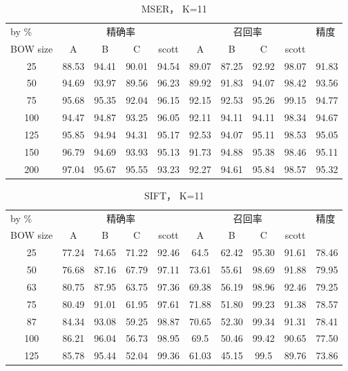 \documentclass{article}
\begin{document}
\begin{table}[]
\begin{tabular}{|c|c|c|c|c|c|c|c|c|c|}
\hline
\multicolumn{1}{|l|}{by \%} & \multicolumn{4}{c|}{精确率} & \multicolumn{4}{c|}{召回率} & \multicolumn{1}{l|}{\multirow{2}{*}{精度}} \\ \cline{1-9}
BOW size & A & B & C & scott & A & B & C & scott & \multicolumn{1}{l|}{} \\ \hline
25 & 88.53 & 94.41 & 90.01 & 94.54 & 89.07 & 87.25 & 92.92 & 98.07 & 91.83 \\ \hline
50 & 94.69 & 93.97 & 89.56 & 96.23 & 89.92 & 91.83 & 94.07 & 98.42 & 93.56 \\ \hline
75 & 95.68 & 95.35 & 92.04 & 96.15 & 92.15 & 92.53 & 95.26 & 99.15 & 94.77 \\ \hline
100 & 94.47 & 94.87 & 93.25 & 96.05 & 92.11 & 94.11 & 94.11 & 98.34 & 94.67 \\ \hline
125 & 95.85 & 94.94 & 94.31 & 95.17 & 92.53 & 94.07 & 95.11 & 98.53 & 95.05 \\ \hline
150 & 96.79 & 94.69 & 93.93 & 95.13 & 91.73 & 94.88 & 95.38 & 98.46 & 95.11 \\ \hline
200 & 97.04 & 95.67 & 95.55 & 93.23 & 92.27 & 94.61 & 95.84 & 98.57 & 95.32 \\ \hline
\end{tabular}
\caption{MSER， K=11}
\end{table}

\begin{table}[]
\begin{tabular}{|c|c|c|c|c|c|c|c|c|c|}
\hline
\multicolumn{1}{|l|}{by \%} & \multicolumn{4}{c|}{精确率} & \multicolumn{4}{c|}{召回率} & \multicolumn{1}{l|}{\multirow{2}{*}{精度}} \\ \cline{1-9}
BOW size & A & B & C & scott & A & B & C & scott & \multicolumn{1}{l|}{} \\ \hline
25 & 77.24 & 74.65 & 71.22 & 92.46 & 64.5 & 62.42 & 95.30 & 91.61 & 78.46 \\ \hline
50 & 76.68 & 87.16 & 67.79 & 97.11 & 73.61 & 55.61 & 98.69 & 91.88 & 79.95 \\ \hline
63 & 80.75 & 87.95 & 63.75 & 97.36 & 69.38 & 56.19 & 98.96 & 92.46 & 79.25 \\ \hline
75 & 80.49 & 91.01 & 61.95 & 97.61 & 71.88 & 51.80 & 99.23 & 91.38 & 78.57 \\ \hline
87 & 84.34 & 93.08 & 59.25 & 98.87 & 70.65 & 52.30 & 99.34 & 91.31 & 78.41 \\ \hline
100 & 86.21 & 96.04 & 56.73 & 98.95 & 69.5 & 50.46 & 99.42 & 90.65 & 77.50 \\ \hline
125 & 85.78 & 95.44 & 52.04 & 99.36 & 61.03 & 45.15 & 99.5 & 89.76 & 73.86 \\ \hline
\end{tabular}
\caption{SIFT， K=11}
\end{table}
\end{document}
